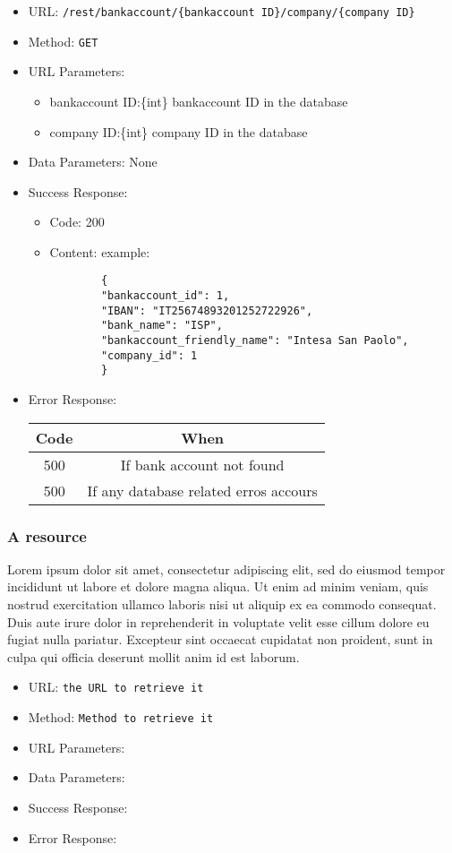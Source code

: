 \begin{itemize}
    \item URL: \texttt{/rest/bankaccount/\{bankaccount ID\}/company/\{company ID\}}
    \item Method: \texttt{GET}
    \item URL Parameters: 
        \begin{itemize}
            \item bankaccount ID:\{int\} bankaccount ID in the database
            \item company ID:\{int\} company ID in the database
        \end{itemize}
    \item Data Parameters: None
    \item Success Response: 
    \begin{itemize}
        \item Code: 200
        \item Content: example:
        \begin{lstlisting}
        {
        "bankaccount_id": 1,
        "IBAN": "IT25674893201252722926",
        "bank_name": "ISP",
        "bankaccount_friendly_name": "Intesa San Paolo",
        "company_id": 1
        }
        \end{lstlisting}   
    \end{itemize}
        \item Error Response:
        \begin{table}[!h]
        \centering 
        \begin{tabular}{|c|c|}
        \hline
        \multicolumn{1}{|c|}{\textbf{Code}} & \multicolumn{1}{c|}{\textbf{When}} \\ \hline
        500 & If bank account not found \\\hline
        500 & If any database related erros accours\\\hline
        \end{tabular} 
        \end{table} 
    
\end{itemize}


\subsubsection*{A resource}


Lorem ipsum dolor sit amet, consectetur adipiscing elit, sed do eiusmod tempor incididunt ut labore et dolore magna aliqua. Ut enim ad minim veniam, quis nostrud exercitation ullamco laboris nisi ut aliquip ex ea commodo consequat. Duis aute irure dolor in reprehenderit in voluptate velit esse cillum dolore eu fugiat nulla pariatur. Excepteur sint occaecat cupidatat non proident, sunt in culpa qui officia deserunt mollit anim id est laborum.


\begin{itemize}
    \item URL: \texttt{the URL to retrieve it}
    \item Method: \texttt{Method to retrieve it}
    \item URL Parameters:
    \item Data Parameters: 
    \item Success Response:
    \item Error Response:
    
\end{itemize}


